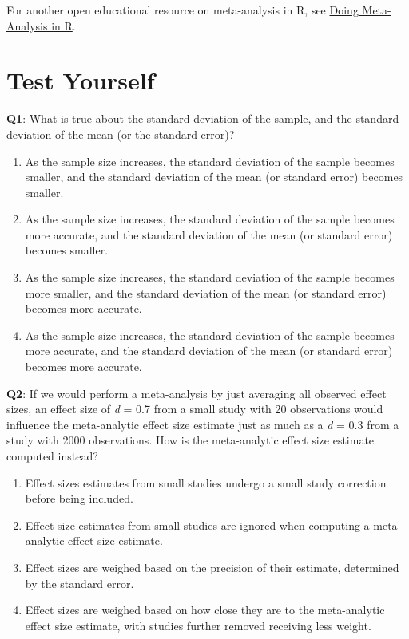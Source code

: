\documentclass[
  oneside]{krantz}
\providecommand{\tightlist}{%
  \setlength{\itemsep}{0pt}\setlength{\parskip}{0pt}}
\begin{document}
For another open educational resource on meta-analysis in R, see \href{https://bookdown.org/MathiasHarrer/Doing_Meta_Analysis_in_R}{Doing Meta-Analysis in R}.

\hypertarget{test-yourself-9}{%
\section{Test Yourself}\label{test-yourself-9}}

\textbf{Q1}: What is true about the standard deviation of the sample, and the standard deviation of the mean (or the standard error)?

\begin{enumerate}
\def\labelenumi{\Alph{enumi})}
\tightlist
\item
  As the sample size increases, the standard deviation of the sample becomes smaller, and the standard deviation of the mean (or standard error) becomes smaller.
\item
  As the sample size increases, the standard deviation of the sample becomes more accurate, and the standard deviation of the mean (or standard error) becomes smaller.
\item
  As the sample size increases, the standard deviation of the sample becomes more smaller, and the standard deviation of the mean (or standard error) becomes more accurate.
\item
  As the sample size increases, the standard deviation of the sample becomes more accurate, and the standard deviation of the mean (or standard error) becomes more accurate.
\end{enumerate}

\textbf{Q2}: If we would perform a meta-analysis by just averaging all observed effect sizes, an effect size of \emph{d} = 0.7 from a small study with 20 observations would influence the meta-analytic effect size estimate just as much as a \emph{d} = 0.3 from a study with 2000 observations. How is the meta-analytic effect size estimate computed instead?

\begin{enumerate}
\def\labelenumi{\Alph{enumi})}
\tightlist
\item
  Effect sizes estimates from small studies undergo a small study correction before being included.
\item
  Effect size estimates from small studies are ignored when computing a meta-analytic effect size estimate.
\item
  Effect sizes are weighed based on the precision of their estimate, determined by the standard error.
\item
  Effect sizes are weighed based on how close they are to the meta-analytic effect size estimate, with studies further removed receiving less weight.
\end{enumerate}
\end{document}

